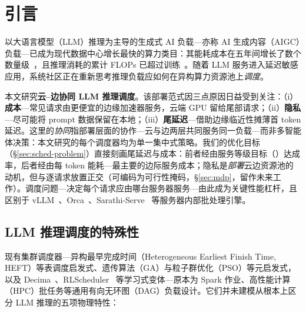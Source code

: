 \section{引言}
\label{sec:intro}

以大语言模型（LLM）推理为主导的生成式 AI 负载---亦称 AI 生成内容（AIGC）负载---已成为现代数据中心增长最快的算力类目：其能耗成本在五年间增长了数个数量级~\cite{patterson2021carbon}，且推理消耗的累计 FLOPs 已超过训练~\cite{patel2024splitwise}。随着 LLM 服务进入延迟敏感应用，系统社区正在重新思考推理负载应如何在异构算力资源池上\emph{调度}。

本文研究\textbf{云--边协同 LLM 推理调度}。该部署范式因三点原因日益受到关注：（i）\textbf{成本}---常见请求由更便宜的边缘加速器服务，云端 GPU 留给尾部请求；（ii）\textbf{隐私}---尽可能将 prompt 数据保留在本地；（iii）\textbf{尾延迟}---借助边缘临近性摊薄首 token 延迟。这里的\emph{协同}指部署层面的协作---云与边两层共同服务同一负载---而非多智能体决策：本文研究的每个调度器均为单一集中式策略。我们的优化目标（\S\ref{sec:sched-problem}）直接刻画尾延迟与成本：前者经由服务等级目标（\slo{}）达成率，后者经由每 token 能耗---最主要的边际服务成本；隐私是\emph{部署}云边资源池的动机，但与逐请求放置正交（可编码为可行性掩码，\S\ref{sec:mdp}，留作未来工作）。调度问题---决定每个请求应由哪台服务器服务---由此成为关键性能杠杆，且区别于 vLLM~\cite{kwon2023vllm}、Orca~\cite{yu2022orca}、Sarathi-Serve~\cite{agrawal2024sarathi} 等服务器内部批处理引擎。

\subsection{LLM 推理调度的特殊性}

现有集群调度器---异构最早完成时间（Heterogeneous Earliest Finish Time, HEFT）等表调度启发式、遗传算法（GA）与粒子群优化（PSO）等元启发式，以及 Decima~\cite{mao2019decima}、RLScheduler~\cite{zhang2020rlscheduler} 等学习式变体---原本为 Spark 作业、高性能计算（HPC）批任务等通用有向无环图（DAG）负载设计。它们并未建模从根本上区分 LLM 推理的五项物理特性：

